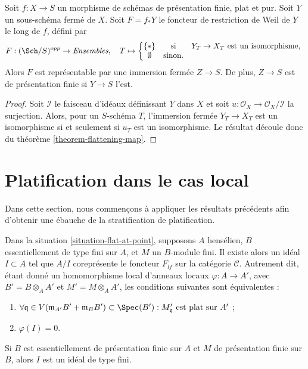 \begin{lemma}
\label{lemma-Weil-restriction-closed-subschemes}
Soit $f:X\to S$ un morphisme de schémas de présentation finie,
plat et pur. Soit $Y$ un sous-schéma fermé de $X$. Soit $F=f_*Y$ le
foncteur de restriction de Weil de $Y$ le long de $f$, défini par
$$
F : (\Sch/S)^{opp} \to \textit{Ensembles}, \quad
T \mapsto
\left\{
\begin{matrix}
\{*\} & \text{si} & Y_T\to X_T \text{ est un isomorphisme, }\\
\emptyset & \text{sinon.} &
\end{matrix}
\right.
$$
Alors $F$ est représentable par une immersion fermée $Z\to S$. De plus,
$Z\to S$ est de présentation finie si $Y\to S$ l'est.
\end{lemma}

\begin{proof}
Soit $\mathcal{I}$ le faisceau d'idéaux définissant $Y$ dans $X$ et soit
$u:\mathcal{O}_X\to\mathcal{O}_X/\mathcal{I}$ la surjection.
Alors, pour un $S$-schéma $T$, l'immersion fermée $Y_T\to X_T$
est un isomorphisme si et seulement si $u_T$ est un isomorphisme. Le résultat
découle donc du
théorème \ref{theorem-flattening-map}.
\end{proof}



\section{Platification dans le cas local}
\label{section-flattening-local}

\noindent
Dans cette section, nous commençons à appliquer les résultats précédents afin d'obtenir une
ébauche de la stratification de platification.

\begin{theorem}
\label{theorem-flattening-local}
Dans la
situation \ref{situation-flat-at-point},
supposons $A$ hensélien, $B$ essentiellement de type fini sur $A$, et
$M$ un $B$-module fini. Il existe alors un idéal
$I \subset A$ tel que $A/I$ coreprésente le foncteur $F_{lf}$ sur la catégorie
$\mathcal{C}$. Autrement dit, étant donné un homomorphisme local d'anneaux locaux
$\varphi : A \to A'$, avec $B' = B \otimes_A A'$ et $M' = M \otimes_A A'$,
les conditions suivantes sont équivalentes :
\begin{enumerate}
\item $\forall \mathfrak q \in V(\mathfrak m_{A'}B' + \mathfrak m_B B')
\subset \Spec(B') :
M'_{\mathfrak q}\text{ est plat sur }A'$ ;
\item $\varphi(I) = 0$.
\end{enumerate}
Si $B$ est essentiellement de présentation finie sur $A$ et $M$
de présentation finie sur $B$, alors $I$ est un idéal de type fini.
\end{theorem}

